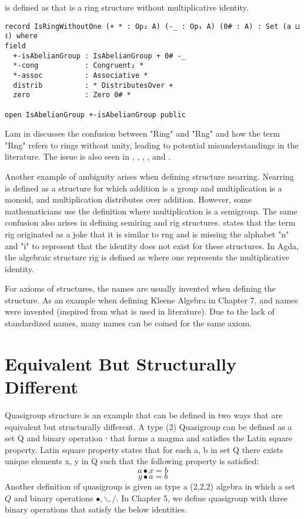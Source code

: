  is defined as  that is a ring structure without
multiplicative identity.

\begin{verbatim}
record IsRingWithoutOne (+ * : Op₂ A) (-_ : Op₁ A) (0# : A) : Set (a ⊔ ℓ) where
field
  +-isAbelianGroup : IsAbelianGroup + 0# -_
  *-cong           : Congruent₂ *
  *-assoc          : Associative *
  distrib          : * DistributesOver +
  zero             : Zero 0# *

open IsAbelianGroup +-isAbelianGroup public
\end{verbatim}

Lam in \cite{lam1991first} discusses the confusion between "Ring" and "Rng" and
how the term "Rng" refers to rings without unity, leading to potential
misunderstandings in the literature. The issue is also seen in
\cite{bosma1997magma}, \cite{jacobson1956structure},
\cite{persson1999application}, \cite{lehmann1977algebraic}, and
\cite{geuvers2002constructive}.

Another example of ambiguity arises when defining structure nearring. Nearring
is defined as a structure for which addition is a group and multiplication is a
monoid, and multiplication distributes over addition. However, some
mathematicians use the definition where multiplication is a semigroup. The same
confusion also arises in defining semiring and rig structures.
\cite{rasuli2022anti} states that the term rig originated as a joke that it is
similar to rng and is missing the alphabet "n" and "i" to represent that the
identity does not exist for these structures. In Agda, the algebraic structure
rig is defined as  where one represents the
multiplicative identity.

For axioms of structures, the names are usually invented when defining the
structure. As an example when defining Kleene Algebra in Chapter 7,
 and  names were invented
(inspired from what is used in literature). Due to the lack of standardized
names, many names can be coined for the same axiom. 

\section{Equivalent But Structurally Different}
Quasigroup structure is an example that can be defined in two ways that are
equivalent but structurally different. A type (2) Quasigroup can be defined as a
set Q and binary operation ∙ that forms a magma and satisfies the Latin square
property. Latin square property states that for each a, b in set Q there exists
unique elements x, y in Q such that the following property is satisfied:
\begin{equation}
a ∙ x = b
\end{equation}
\begin{equation}
y ∙ a = b
\end{equation}
Another definition of quasigroup is given as type a (2,2,2) algebra in which a
set $Q$ and binary operations $∙, \backslash, /$. In Chapter 5, we define
quasigroup with three binary operations that satisfy the below identities.

